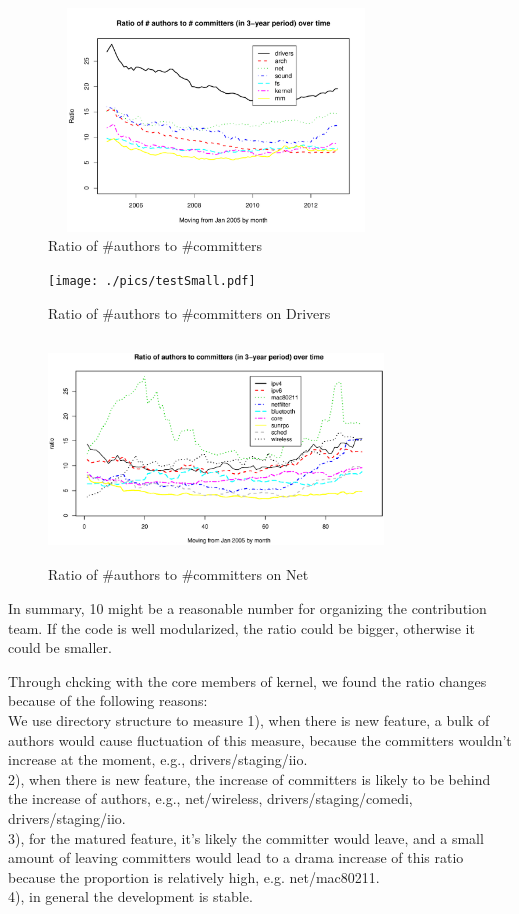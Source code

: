 \documentclass{sig-alternate-05-2015}
\begin{document}
\begin{figure}
\centering
\includegraphics[height=2.33in, width=3.5in]{./pics/a2c.pdf}
\caption{Ratio of \#authors to \#committers}
\label{fig:atr2cmtr}
\end{figure}

\begin{figure}
\centering
\texttt{[image: ./pics/testSmall.pdf]}
\caption{Ratio of \#authors to \#committers on Drivers}
\label{fig:ratiodrivers}
\end{figure}

\begin{figure}
\centering
\includegraphics[height=2.33in, width=3.5in]{./pics/atr2cmtrNET.eps}
\caption{Ratio of \#authors to \#committers on Net}
\label{fig:rationet}
\end{figure}

In summary, 10 might be a reasonable number for organizing the contribution
team. If the code is well modularized, the ratio could be bigger, otherwise
it could be smaller.

Through chcking with the core members of kernel, we found the ratio changes because of the following reasons: \\
We use directory structure to measure 
1), when there is new feature, a bulk of authors would cause fluctuation of this measure,
because the committers wouldn't increase at the moment, e.g., drivers/staging/iio. \\
2), when there is new feature, the increase of committers is likely to be behind
the increase of authors, e.g., net/wireless, drivers/staging/comedi, drivers/staging/iio.  \\
3), for the matured feature, it's likely the committer would leave, and a small amount
of leaving committers would lead to a drama increase of this ratio because the proportion
is relatively high, e.g. net/mac80211. \\
4), in general the development is stable.
\end{document}

